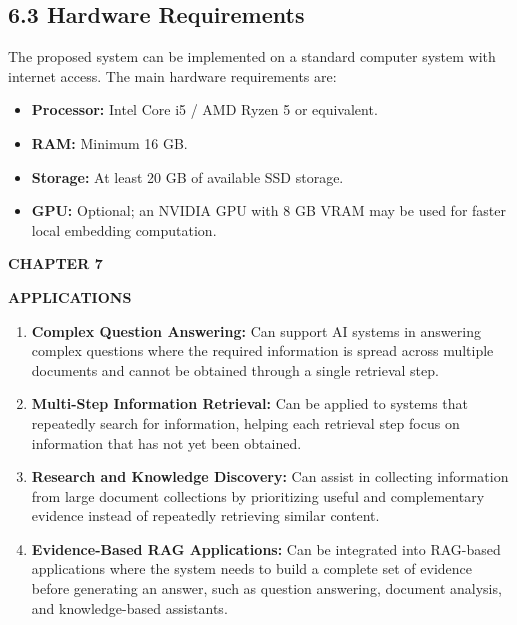 \documentclass[12pt,a4paper]{report}
\newcommand{\chaptertitle}[2]{
    \begin{center}
        {\fontsize{18}{21}\selectfont\bfseries CHAPTER #1\par}
        \vspace{0.10in}
        {\fontsize{18}{21}\selectfont\bfseries #2\par}
    \end{center}
    \vspace{0.12in}
}
\begin{document}
\subsection*{6.3 Hardware Requirements}

The proposed system can be implemented on a standard computer system
with internet access. The main hardware requirements are:

\begin{itemize}[leftmargin=0.30in,itemsep=0.08in]
\item \textbf{Processor:} Intel Core i5 / AMD Ryzen 5 or equivalent.
\item \textbf{RAM:} Minimum 16 GB.
\item \textbf{Storage:} At least 20 GB of available SSD storage.
\item \textbf{GPU:} Optional; an NVIDIA GPU with 8 GB VRAM may be used
for faster local embedding computation.
\end{itemize}

\clearpage

\chaptertitle{7}{APPLICATIONS}

\begin{enumerate}[leftmargin=0.30in,itemsep=0.12in]

\item
\textbf{Complex Question Answering:} Can support AI systems in answering complex questions where the required information is spread across multiple documents and cannot be obtained through a single retrieval step.

\item
\textbf{Multi-Step Information Retrieval:} Can be applied to systems that repeatedly search for information, helping each retrieval step focus on information that has not yet been obtained.

\item
\textbf{Research and Knowledge Discovery:} Can assist in collecting information from large document collections by prioritizing useful and complementary evidence instead of repeatedly retrieving similar content.

\item
\textbf{Evidence-Based RAG Applications:} Can be integrated into RAG-based applications where the system needs to build a complete set of evidence before generating an answer, such as question answering, document analysis, and knowledge-based assistants.

\end{enumerate}
\clearpage
\end{document}
